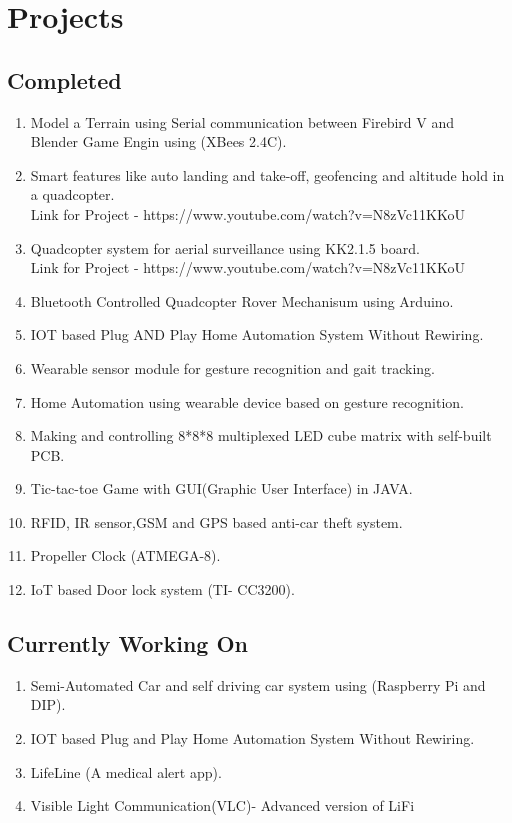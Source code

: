 \documentclass[11pt]{article}
\begin{document}
\begin{minipage}{1.0\linewidth}

\section{\color{orange}Pro\color{black}jects}
\subsection{Co\color{purple}m\color{black}pl\color{purple}e\color{black}ted}
\begin{enumerate}
\item Model a Terrain using Serial communication between Firebird V and\\ Blender Game Engin using (XBees 2.4C).
\item Smart features like auto landing and take-off, geofencing and altitude hold in a quadcopter.
\\Link for Project - https://www.youtube.com/watch?v=N8zVc11KKoU
\item Quadcopter system for aerial surveillance using KK2.1.5 board. \\Link for Project - https://www.youtube.com/watch?v=N8zVc11KKoU
\item Bluetooth Controlled Quadcopter Rover Mechanisum using Arduino.
\item IOT based Plug AND Play Home Automation System Without Rewiring.
\item Wearable sensor module for gesture recognition and gait tracking.
\item Home Automation using wearable device based on gesture recognition.  
\item Making and controlling 8*8*8 multiplexed LED cube matrix with self-built PCB.
\item Tic-tac-toe Game with GUI(Graphic User Interface) in JAVA.
\item RFID, IR sensor,GSM and GPS based anti-car theft system.
\item Propeller Clock  (ATMEGA-8).
\item IoT based Door lock system (TI- CC3200).
\end{enumerate}
\subsection{Currently Working On}
\begin{enumerate}
\item Semi-Automated Car and self driving car system using (Raspberry Pi and\\ DIP). 
\item IOT based Plug and Play Home Automation System Without Rewiring. 
\item LifeLine (A medical alert app). 
\item Visible Light Communication(VLC)- Advanced version of LiFi
\end{enumerate}


\end{minipage}
\end{document}
